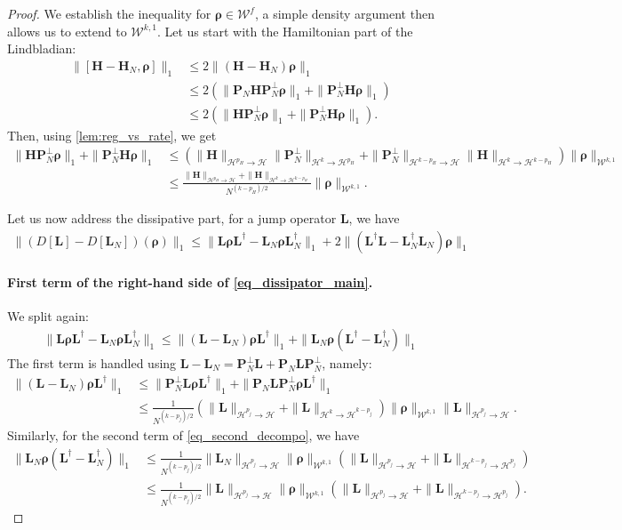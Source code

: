 \documentclass{article}
\newcommand{\xH}{\mathcal{H}}
\newcommand{\xW}{\mathcal{W}}
\let\bf\boldsymbol
\newcommand{\orho}{{\bf \rho}}
\newcommand{\oL}{{\bf L}}
\newcommand{\oH}{{\bf H}}
\newcommand{\oP}{{\bf P}}
\begin{document}
\begin{proof}
    We establish the inequality for $\orho\in \xW^f$, a simple density argument then allows us to extend to $\xW^{k,1}$. Let us start with the Hamiltonian part of the Lindbladian:
    \begin{align}
        \|[\oH-\oH_N,\orho]\|_1 &\leq 2 \| (\oH-\oH_N)\orho\|_1\\
        & \leq 2 (\| \oP_N \oH \oP_N^\perp \orho \|_1 + \| \oP_N^\perp \oH \orho \|_1)\\
        & \leq 2 (\| \oH \oP_N^\perp \orho \|_1 + \| \oP_N^\perp \oH \orho \|_1).
    \end{align}
    Then, using \cref{lem:reg_vs_rate}, we get
    \begin{align}
        \| \oH \oP_N^\perp \orho \|_1+ \| \oP_N^\perp \oH \orho \|_1&
        \leq \left( \|\oH\|_{\xH^{p_H}\to \xH} \|\oP_N^\perp\|_{\xH^k \to \xH^{p_H}} + \|\oP_N^\perp\|_{\xH^{k-p_H}\to \xH} \|\oH\|_{\xH^{k}\to \xH^{k-p_H}} \right)\|\orho\|_{\xW^{k,1}}\\
        &\leq \frac{\|\oH\|_{\xH^{p_H}\to \xH}+\|\oH\|_{\xH^{k}\to \xH^{k-p_H}}}{N^{(k-p_H)/2}} \|\orho\|_{\xW^{k,1}}.
    \end{align}

    Let us now address the dissipative part, for a jump operator $\oL$, we have
    \begin{align}
        \label{eq_dissipator_main}
        \|(D[\oL]-D[\oL_N])(\orho)\|_1 \leq \|\oL \orho \oL^\dag - \oL_N\orho \oL_N^\dag\|_1 + 2\|(\oL^\dag \oL-\oL_N^\dag \oL_N)\orho\|_1
    \end{align}
    \paragraph{First term of the right-hand side of \cref{eq_dissipator_main}.} We split again:
    \begin{align}
        \label{eq_second_decompo}
        \|\oL \orho \oL^\dag -\oL_N\orho \oL_N^\dag\|_1\leq \|(\oL-\oL_N)\orho \oL^\dag\|_1 +\|\oL_N\orho (\oL^\dag-\oL_N^\dag)\|_1
    \end{align}
    The first term is handled using $ \oL -\oL_N= \oP_N^\perp \oL + \oP_N \oL \oP_N^\perp$, namely:
    \begin{align}
        \|(\oL-\oL_N)\orho \oL^\dag\|_1 & \leq \|\oP_N^\perp \oL \orho \oL^\dag\|_1+ \|\oP_N \oL \oP_N^\perp \orho \oL^\dag\|_1\\
        & \leq \frac{1}{N^{(k-p_j)/2}}\left( \|\oL \|_{\xH^{p_j}\to \xH}+\|\oL \|_{\xH^{k}\to \xH^{k-p_j}} \right) \|\orho\|_{\xW^{k,1}}\|\oL \|_{\xH^{p_j}\to \xH}.
    \end{align}
    Similarly, for the second term of \cref{eq_second_decompo}, we have
    \begin{align}
        \|\oL_N\orho (\oL^\dag- \oL_N^\dag)\|_1 &\leq \frac{1}{N^{(k-p_j)/2}}\|\oL_N\|_{\xH^{p_j}\to \xH} \|\orho\|_{\xW^{k,1}}\left(\|\oL \|_{\xH^{p_j}\to \xH}+\|\oL \|_{\xH^{k-p_j}\to \xH^{p_j}}\right) \\
        &\leq \frac{1}{N^{(k-p_j)/2}}\|\oL \|_{\xH^{p_j}\to \xH} \|\orho\|_{\xW^{k,1}} \left(\|\oL \|_{\xH^{p_j}\to \xH}+\|\oL \|_{\xH^{k-p_j}\to \xH^{p_j}}\right).
    \end{align}

\end{proof}
\end{document}
